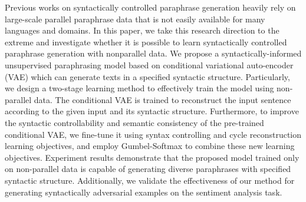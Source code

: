 Previous works on syntactically controlled paraphrase generation heavily rely on large-scale parallel paraphrase data that is not easily available for many languages and domains. In this paper, we take this research direction to the extreme and investigate whether it is possible to learn syntactically controlled paraphrase generation with nonparallel data. We propose a syntactically-informed unsupervised paraphrasing model based on conditional variational auto-encoder (VAE) which can generate texts in a specified syntactic structure. Particularly, we design a two-stage learning method to effectively train the model using non-parallel data. The conditional VAE is trained to reconstruct the input sentence according to the given input and its syntactic structure. Furthermore, to improve the syntactic controllability and semantic consistency of the pre-trained conditional VAE, we fine-tune it using syntax controlling and cycle reconstruction learning objectives, and employ Gumbel-Softmax to combine these new learning objectives. Experiment results demonstrate that the proposed model trained only on non-parallel data is capable of generating diverse paraphrases with specified syntactic structure. Additionally, we validate the effectiveness of our method for generating syntactically adversarial examples on the sentiment analysis task.
